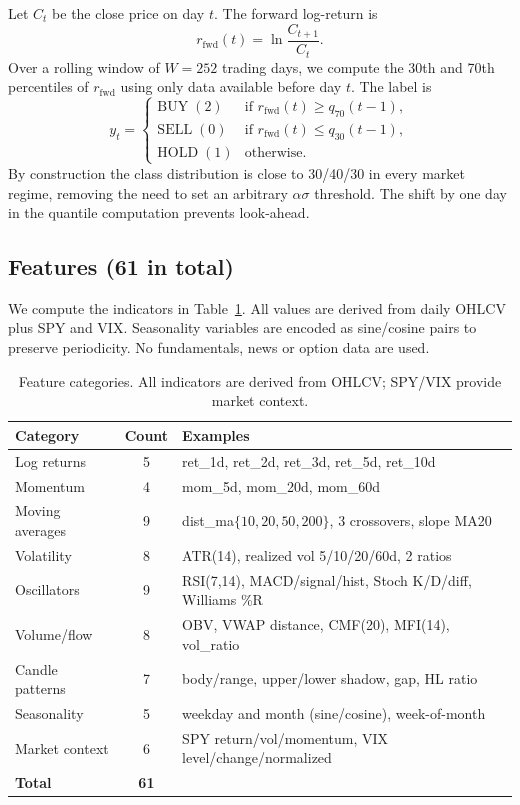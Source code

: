 \documentclass[runningheads]{llncs}
\begin{document}
Let $C_t$ be the close price on day $t$. The forward log-return is
\begin{equation}
r_{\text{fwd}}(t) = \ln\frac{C_{t+1}}{C_t}.
\end{equation}
Over a rolling window of $W = 252$ trading days, we compute the 30th and 70th percentiles of $r_{\text{fwd}}$ using only data available before day $t$. The label is
\begin{equation}
y_t = \begin{cases}
\mathrm{BUY}\;(2) & \text{if } r_{\text{fwd}}(t) \ge q_{70}(t-1),\\
\mathrm{SELL}\;(0) & \text{if } r_{\text{fwd}}(t) \le q_{30}(t-1),\\
\mathrm{HOLD}\;(1) & \text{otherwise.}
\end{cases}
\end{equation}
By construction the class distribution is close to 30/40/30 in every market regime, removing the need to set an arbitrary $\alpha\sigma$ threshold. The shift by one day in the quantile computation prevents look-ahead.

\subsection{Features (61 in total)}

We compute the indicators in Table~\ref{tab:features}. All values are derived from daily OHLCV plus SPY and VIX. Seasonality variables are encoded as sine/cosine pairs to preserve periodicity. No fundamentals, news or option data are used.

\begin{table}[t]
\centering
\caption{Feature categories. All indicators are derived from OHLCV; SPY/VIX provide market context.}
\label{tab:features}
\begin{tabular}{lcl}
\toprule
Category & Count & Examples \\
\midrule
Log returns & 5 & ret\_1d, ret\_2d, ret\_3d, ret\_5d, ret\_10d \\
Momentum & 4 & mom\_5d, mom\_20d, mom\_60d \\
Moving averages & 9 & dist\_ma$\{10,20,50,200\}$, 3 crossovers, slope MA20 \\
Volatility & 8 & ATR(14), realized vol 5/10/20/60d, 2 ratios \\
Oscillators & 9 & RSI(7,14), MACD/signal/hist, Stoch K/D/diff, Williams \%R \\
Volume/flow & 8 & OBV, VWAP distance, CMF(20), MFI(14), vol\_ratio \\
Candle patterns & 7 & body/range, upper/lower shadow, gap, HL ratio \\
Seasonality & 5 & weekday and month (sine/cosine), week-of-month \\
Market context & 6 & SPY return/vol/momentum, VIX level/change/normalized \\
\midrule
\textbf{Total} & \textbf{61} & \\
\bottomrule
\end{tabular}
\end{table}
\end{document}

